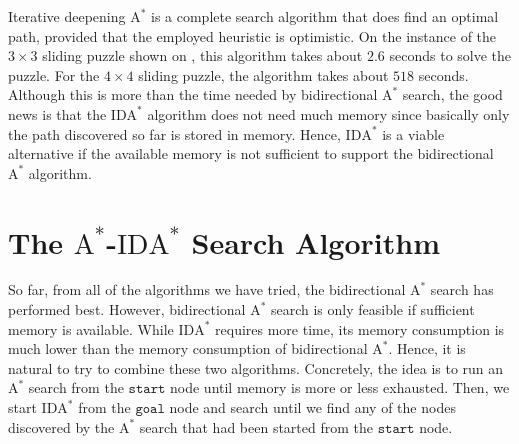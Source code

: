 Iterative deepening $\mathrm{A}^*$ is a complete search algorithm that does find an optimal path, provided that the employed heuristic
is optimistic.  On the instance of the $3 \times 3$ sliding puzzle shown on , this
algorithm takes about $2.6$ seconds to solve the puzzle.  For the $4 \times 4$ sliding puzzle, the algorithm
takes about $518$ seconds.  Although this is more than the time needed by bidirectional $\mathrm{A}^*$ search,
the good news is that the $\mathrm{IDA}^*$ algorithm does not need much memory since basically only the path
discovered so far is stored in memory.  Hence, $\mathrm{IDA}^*$ is a viable alternative if the available memory
is not sufficient to support the bidirectional $\mathrm{A}^*$ algorithm.

\section{The $\mathrm{A}^*$-$\mathrm{IDA}^*$ Search Algorithm}
So far, from all of the algorithms we have tried, the bidirectional $\mathrm{A}^*$ search has performed best.  However,
bidirectional $\mathrm{A}^*$ search is only feasible if sufficient memory is available.   While
$\mathrm{IDA}^*$ requires more time, its memory consumption is much lower than the memory consumption of
bidirectional $\mathrm{A}^*$.  Hence, it is natural to try to combine these two algorithms.  Concretely, the
idea is to run an $\mathrm{A}^*$ search from the $\mathtt{start}$ node until memory is more or less
exhausted.  Then, we start $\mathrm{IDA}^*$ from the $\mathtt{goal}$ node and search until we find any of the
nodes discovered by the $\mathrm{A}^*$ search that had been started from the $\mathtt{start}$ node.

